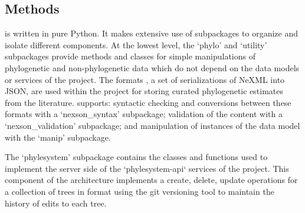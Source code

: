 \begin{methods}
\section{Methods}
\pey is written in pure Python.
It makes extensive use of subpackages to organize and isolate different components.
At the lowest level, the `phylo' and `utility' subpackages provide methods and classes
    for simple manipulations of phylogenetic and non-phylogenetic data which do not
    depend on the data models or services of the \otol project.
The \nexson formats \citep{NexSON}, a set of serializations of NeXML into JSON, are used
    within the project for storing curated phylogenetic estimates from the literature.
\pey supports: syntactic checking and conversions between these formats with a `nexson\_syntax'
    subpackage;
    validation of the content with a `nexson\_validation' subpackage; and 
    manipulation of instances of the \nexson data model with the `manip' subpackage.

The `phylesystem' subpackage contains the classes and functions used to implement the
    server side of the `phylesystem-api` services of the \otol project.
This component of the architecture \citep[described in more detail in][]{phylesystemapi}
    implements a create, delete, update operations for a collection of trees in \nexson
    format using the git versioning tool to maintain the history of edits to each
    tree.


\end{methods}
